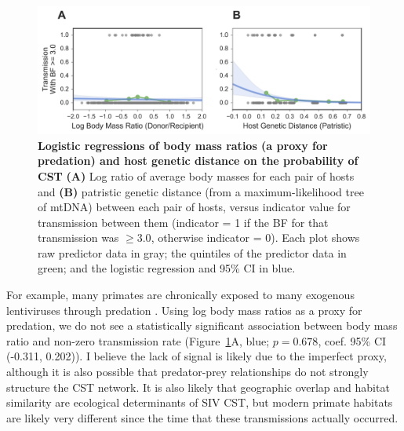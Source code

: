 \begin{figure}[h!]
  \begin{centering}
    \includegraphics[width=.8\linewidth]{./png/siv_predict.png}
  	\caption[Logistic regressions of predictors on the probability of CST]{\textbf{Logistic regressions of body mass ratios (a proxy for predation) and host genetic distance on the probability of CST }
\textbf{(A)} Log ratio of average body masses for each pair of hosts and \textbf{(B)} patristic genetic distance (from a maximum-likelihood tree of mtDNA) between each pair of hosts, versus indicator value for transmission between them (indicator = 1 if the BF for that transmission was $\geq 3.0$, otherwise indicator = 0).
Each plot shows raw predictor data in gray; the quintiles of the predictor data in green; and the logistic regression and 95\% CI in blue.
    }
  	\label{siv_predict}
  \end{centering}
\end{figure}

For example, many primates are chronically exposed to many exogenous lentiviruses through predation \citep{aghokeng2010extensive,goodall1986chimpanzees,sharp2011origins}.
Using log body mass ratios \citep{iucn2008international} as a proxy for predation, we do not see a statistically significant association between body mass ratio and non-zero transmission rate (Figure~\ref{siv_predict}A, blue; $p=0.678$, coef. 95\% CI (-0.311, 0.202)).
I believe the lack of signal is likely due to the imperfect proxy, although it is also possible that predator-prey relationships do not strongly structure the CST network.
It is also likely that geographic overlap and habitat similarity are ecological determinants of SIV CST, but modern primate habitats are likely very different since the time that these transmissions actually occurred.

